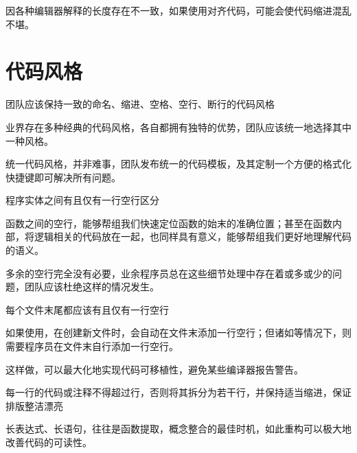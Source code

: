 \begin{content}
{\begin{end}
\begin{content}
因各种编辑器解释的长度存在不一致，如果使用对齐代码，可能会使代码缩进混乱不堪。

\end{content}

\section{代码风格}

\begin{content}

\begin{regulation}
团队应该保持一致的命名、缩进、空格、空行、断行的代码风格
\end{regulation}

业界存在多种经典的代码风格，各自都拥有独特的优势，团队应该统一地选择其中一种风格。

\begin{enum}
\end{enum}

统一代码风格，并非难事，团队发布统一的代码模板，及其定制一个方便的格式化快捷键即可解决所有问题。

\begin{regulation}
程序实体之间有且仅有一行空行区分
\end{regulation}

函数之间的空行，能够帮组我们快速定位函数的始末的准确位置；甚至在函数内部，将逻辑相关的代码放在一起，也同样具有意义，能够帮组我们更好地理解代码的语义。

多余的空行完全没有必要，业余程序员总在这些细节处理中存在着或多或少的问题，团队应该杜绝这样的情况发生。

\begin{regulation}
每个文件末尾都应该有且仅有一行空行
\end{regulation}

如果使用，在创建新文件时，会自动在文件末添加一行空行；但诸如等情况下，则需要程序员在文件末自行添加一行空行。

这样做，可以最大化地实现代码可移植性，避免某些编译器报告警告。

\begin{regulation}
每一行的代码或注释不得超过行，否则将其拆分为若干行，并保持适当缩进，保证排版整洁漂亮
\end{regulation}

长表达式、长语句，往往是函数提取，概念整合的最佳时机，如此重构可以极大地改善代码的可读性。


\end{content}
\end{end}}
\end{content}
